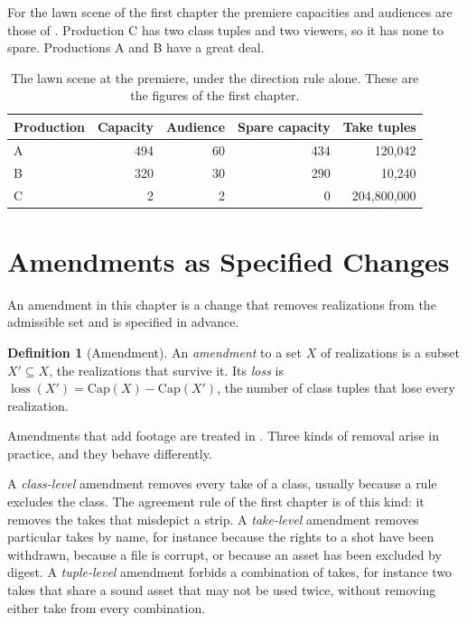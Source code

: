 \documentclass[11pt,twoside,openright]{book}
\theoremstyle{plain}
\theoremstyle{definition}
\newtheorem{definition}[theorem]{Definition}
\theoremstyle{remark}
\newcommand{\Capac}{\mathrm{Cap}}
\DeclareMathOperator{\loss}{loss}
\begin{document}
For the lawn scene of the first chapter the premiere capacities and audiences are those of . Production C has two class tuples and two viewers, so it has none to spare. Productions A and B have a great deal.

\begin{table}[ht]
\centering
\begin{tabular}{@{}lrrrr@{}}
\toprule
Production & Capacity & Audience & Spare capacity & Take tuples\\
\midrule
A & 494 & 60 & 434 & 120,042\\
B & 320 & 30 & 290 & 10,240\\
C & 2 & 2 & 0 & 204,800,000\\
\bottomrule
\end{tabular}
\caption{The lawn scene at the premiere, under the direction rule alone. These are the figures of the first chapter.}\label{tab:premiere}
\end{table}

\section{Amendments as Specified Changes}\label{sec:amend}

An amendment in this chapter is a change that removes realizations from the admissible set and is specified in advance.

\begin{definition}[Amendment]\label{def:amend}
An \emph{amendment} to a set $X$ of realizations is a subset $X'\subseteq X$, the realizations that survive it. Its \emph{loss} is $\loss(X')=\Capac(X)-\Capac(X')$, the number of class tuples that lose every realization.
\end{definition}

Amendments that add footage are treated in . Three kinds of removal arise in practice, and they behave differently.

A \emph{class-level} amendment removes every take of a class, usually because a rule excludes the class. The agreement rule of the first chapter is of this kind: it removes the takes that misdepict a strip. A \emph{take-level} amendment removes particular takes by name, for instance because the rights to a shot have been withdrawn, because a file is corrupt, or because an asset has been excluded by digest. A \emph{tuple-level} amendment forbids a combination of takes, for instance two takes that share a sound asset that may not be used twice, without removing either take from every combination.
\end{document}
